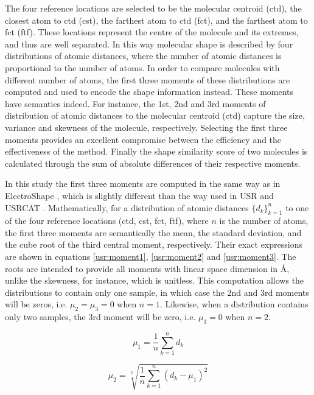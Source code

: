 The four reference locations are selected to be the molecular centroid (ctd), the closest atom to ctd (cst), the farthest atom to ctd (fct), and the farthest atom to fct (ftf). These locations represent the centre of the molecule and its extremes, and thus are well separated. In this way molecular shape is described by four distributions of atomic distances, where the number of atomic distances is proportional to the number of atoms. In order to compare molecules with different number of atoms, the first three moments of these distributions are computed and used to encode the shape information instead. These moments have semantics indeed. For instance, the 1st, 2nd and 3rd moments of distribution of atomic distances to the molecular centroid (ctd) capture the size, variance and skewness of the molecule, respectively. Selecting the first three moments provides an excellent compromise between the efficiency and the effectiveness of the method. Finally the shape similarity score of two molecules is calculated through the sum of absolute differences of their respective moments.

In this study the first three moments are computed in the same way as in ElectroShape \citep{1337}, which is slightly different than the way used in USR \citep{1379,1332,1380} and USRCAT \citep{1331}. Mathematically, for a distribution of atomic distances $\{d_k\}_{k=1}^n$ to one of the four reference locations (ctd, cst, fct, ftf), where $n$ is the number of atoms, the first three moments are semantically the mean, the standard deviation, and the cube root of the third central moment, respectively. Their exact expressions are shown in equations \eqref{usr:moment1}, \eqref{usr:moment2} and \eqref{usr:moment3}. The roots are intended to provide all moments with linear space dimension in \AA, unlike the skewness, for instance, which is unitless. This computation allows the distributions to contain only one sample, in which case the 2nd and 3rd moments will be zeros, i.e. $\mu_2=\mu_3=0$ when $n=1$. Likewise, when a distribution contains only two samples, the 3rd moment will be zero, i.e. $\mu_3=0$ when $n=2$.

\begin{equation}
\mu_1=\frac{1}{n}\sum_{k=1}^{n}{d_k}
\label{usr:moment1}
\end{equation}

\begin{equation}
\mu_2=\sqrt[2]{\frac{1}{n}\sum_{k=1}^{n}{(d_k-\mu_1)^2}}
\label{usr:moment2}
\end{equation}

